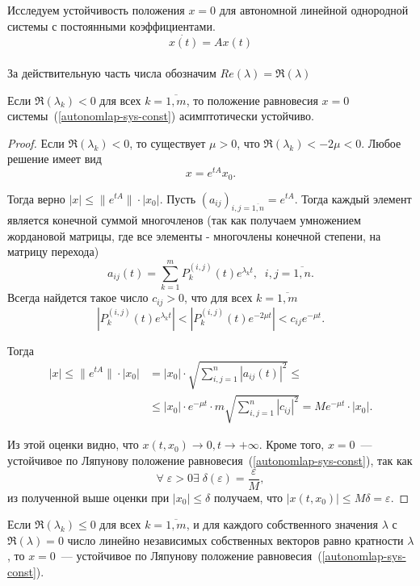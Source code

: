 Исследуем устойчивость положения $x = 0$ для автономной линейной однородной системы с постоянными коэффициентами.
\begin{equation}\label{autonomlap-sys-const}
    \dot{x(t)} = Ax(t)
\end{equation}
\\
\Note За действительную часть числа обозначим $Re(\lambda) = \Re(\lambda)$

\begin{theorem}\label{autonomlap-th1}
Если $\Re(\lambda_k) < 0$ для всех $k = \overline{1, m}$, то положение равновесия $x = 0$ системы~(\ref{autonomlap-sys-const}) асимптотически устойчиво.
\end{theorem}
\begin{proof}
Если  $\Re(\lambda_k) < 0$, то существует $\mu > 0$, что $\Re(\lambda_k) < -2\mu < 0$.
Любое решение имеет вид \[x = e^{tA} x_0.\]

Тогда верно \(|x| \leq \|e^{tA}\| \cdot |x_0|\).
Пусть \((a_{ij})_{i,j = \overline{1, n}} = e^{tA}.\) Тогда каждый элемент является конечной суммой многочленов (так как получаем умножением жордановой матрицы, где все элементы - многочлены конечной степени, на матрицу перехода)
\[a_{ij}(t) = \sum_{k = 1}^m P_k^{(i, j)}(t) e^{\lambda_k t}, \;\;  i,j = \overline{1, n}.\]
Всегда найдется такое число $c_{ij} > 0$, что для всех $k = \overline{1, m}$
\[|P_k^{(i, j)}(t) e^{\lambda_k t}|<|P_k^{(i, j)}(t) e^{-2\mu t}| < c_{ij} e^{-\mu t}.\]

Тогда 
\begin{align*}
    |x| \leq \|e^{tA}\| \cdot |x_0| &= |x_0| \cdot \sqrt{\sum_{i, j = 1}^{n}|a_{ij}(t)|^2} \leq\\
    &\leq |x_0| \cdot e^{-\mu t} \cdot m \sqrt{\sum_{i, j = 1}^{n}|c_{ij}|^2} = M e^{-\mu t} \cdot |x_0|.
\end{align*}

Из этой оценки видно, что $x(t, x_0) \rightarrow 0, t \rightarrow +\infty$. Кроме того, $x=0$~--- устойчивое по Ляпунову положение равновесия~(\ref{autonomlap-sys-const}), так как 
\[\forall\; \varepsilon > 0 \exists\; \delta(\varepsilon) = \frac{\varepsilon}{M},\]
из полученной выше оценки при $|x_0| \le \delta$ получаем, что $|x(t, x_0)| \leq M \delta = \varepsilon$.
\end{proof}
\begin{theorem}
Если $\Re(\lambda_k) \leq 0$ для всех $k = \overline{1, m}$, и для каждого собственного значения $\lambda$ с $\Re(\lambda) = 0$ число линейно независимых собственных векторов равно кратности $\lambda$, то $x = 0$~--- устойчивое по Ляпунову положение равновесия~(\ref{autonomlap-sys-const}).
\end{theorem}

